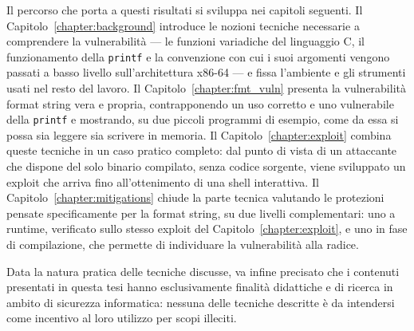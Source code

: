 Il percorso che porta a questi risultati si sviluppa nei capitoli seguenti. Il Capitolo~\ref{chapter:background} introduce le nozioni tecniche necessarie a comprendere la vulnerabilità --- le funzioni variadiche del linguaggio C, il funzionamento della \texttt{printf} e la convenzione con cui i suoi argomenti vengono passati a basso livello sull'architettura x86-64 --- e fissa l'ambiente e gli strumenti usati nel resto del lavoro. Il Capitolo~\ref{chapter:fmt_vuln} presenta la vulnerabilità format string vera e propria, contrapponendo un uso corretto e uno vulnerabile della \texttt{printf} e mostrando, su due piccoli programmi di esempio, come da essa si possa sia leggere sia scrivere in memoria. Il Capitolo~\ref{chapter:exploit} combina queste tecniche in un caso pratico completo: dal punto di vista di un attaccante che dispone del solo binario compilato, senza codice sorgente, viene sviluppato un exploit che arriva fino all'ottenimento di una shell interattiva. Il Capitolo~\ref{chapter:mitigations} chiude la parte tecnica valutando le protezioni pensate specificamente per la format string, su due livelli complementari: uno a runtime, verificato sullo stesso exploit del Capitolo~\ref{chapter:exploit}, e uno in fase di compilazione, che permette di individuare la vulnerabilità alla radice.

Data la natura pratica delle tecniche discusse, va infine precisato che i contenuti presentati in questa tesi hanno esclusivamente finalità didattiche e di ricerca in ambito di sicurezza informatica: nessuna delle tecniche descritte è da intendersi come incentivo al loro utilizzo per scopi illeciti.

